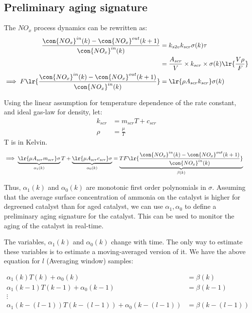 \subsection{Preliminary aging signature}
The $NO_x$ process dynamics can be rewritten as:
\begin{align*}
    \frac{\con{NO_x}^{in}(k) - \con{NO_x}^{out}(k + 1)}{\con{NO_x}^{in}(k)} &=
    k_{s2v} k_{scr} \sigma(k) \tau\\
    &= \frac{A_{scr}}{V} \times k_{scr} \times \sigma(k) \lr{\frac{V \rho}{F}}\\
    \implies F \lr{\frac{\con{NO_x}^{in}(k) - \con{NO_x}^{out}(k + 1)}{\con{NO_x}^{in}(k)}} &= \lr{\rho A_{scr} k_{scr}} \sigma(k) \\
\end{align*}

Using the linear assumption for temperature dependence of the rate constant, and
ideal gas-law for density, let:
\begin{align*}
    k_{scr} &= m_{scr} T + c_{scr}\\
    \rho &= \frac{\mu}{T}
\end{align*}
T is in Kelvin.
\begin{align*}
    \implies \underbrace{\lr{\mu A_{scr} m_{scr}}\sigma}_{\alpha_1(k)}  T+ \underbrace{\lr{\mu A_{scr} c_{scr}} \sigma}_{\alpha_0(k)} &= \underbrace{T F \lr{\frac{\con{NO_x}^{in}(k) - \con{NO_x}^{out}(k + 1)}{\con{NO_x}^{in}(k)}}}_{\beta(k)}
\end{align*}

Thus, $\alpha_1(k)$ and $\alpha_0(k)$ are monotonic first order polynomials in $\sigma$. Assuming that the average
surface concentration of ammonia on the catalyst is higher for degreened catalyst than for aged catalyst, we can use
$\alpha_1, \alpha_0$ to define a preliminary aging signature for the catalyst. This can be used to monitor the aging of
the catalyst in real-time.

The variables, $\alpha_1(k)$ and $\alpha_0(k)$ change with time. The only way to estimate these variables is to estimate
a moving-averaged version of it.
We have the above equation for $l$ (Averaging window) samples:

\begin{align*}
    \alpha_1(k) T(k) + \alpha_0(k) &= \beta(k)\\
    \alpha_1(k-1)T(k-1) + \alpha_0(k-1) &= \beta(k-1)\\
    \vdots &\\
    \alpha_1(k-(l-1))T(k-(l-1)) + \alpha_0(k-(l-1)) &= \beta(k-(l-1))\\
\end{align*}


